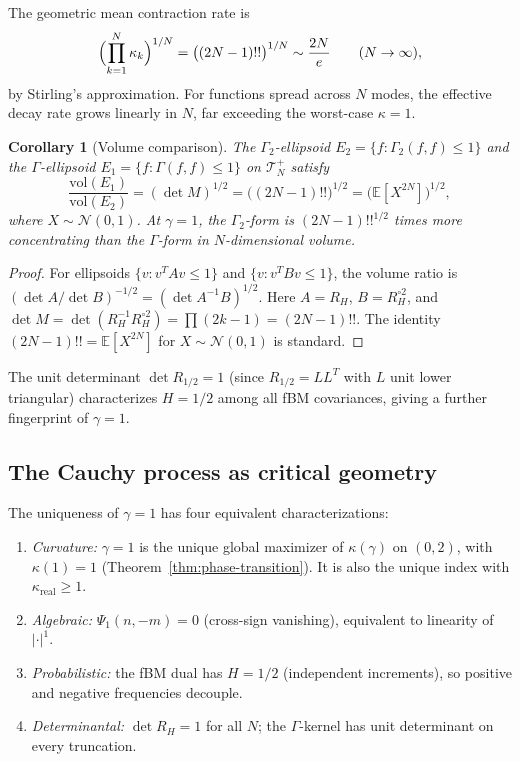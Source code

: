\documentclass[11pt,a4paper]{article}
\theoremstyle{plain}
\newtheorem{corollary}[theorem]{Corollary}
\theoremstyle{definition}
\theoremstyle{remark}
\newcommand{\E}{\mathbb{E}}
\begin{document}
The geometric mean contraction rate is
\[
  \Bigl(\prod_{k=1}^N \kappa_k\Bigr)^{1/N}
  = \bigl((2N-1)!!\bigr)^{1/N} \sim \frac{2N}{e}
  \qquad (N \to \infty),
\]
by Stirling's approximation.
For functions spread across $N$ modes, the effective decay rate
grows linearly in $N$, far exceeding the worst-case $\kappa = 1$.

\begin{corollary}[Volume comparison]\label{cor:volume}
The $\Gamma_2$-ellipsoid
$E_2 = \{f : \Gamma_2(f,f) \leq 1\}$ and the $\Gamma$-ellipsoid
$E_1 = \{f : \Gamma(f,f) \leq 1\}$ on $\mathcal{T}_N^+$ satisfy
\begin{equation}\label{eq:volume-ratio}
  \frac{\mathrm{vol}(E_1)}{\mathrm{vol}(E_2)}
  = (\det M)^{1/2} = \bigl((2N-1)!!\bigr)^{1/2}
  = \bigl(\E[X^{2N}]\bigr)^{1/2},
\end{equation}
where $X \sim \mathcal{N}(0,1)$.
At $\gamma = 1$, the $\Gamma_2$-form is $(2N-1)!!^{1/2}$ times
more concentrating than the $\Gamma$-form in $N$-dimensional volume.
\end{corollary}

\begin{proof}
For ellipsoids $\{v : v^T A v \leq 1\}$ and $\{v : v^T B v \leq 1\}$,
the volume ratio is $(\det A / \det B)^{-1/2} = (\det A^{-1}B)^{1/2}$.
Here $A = R_H$, $B = R_H^{\circ 2}$, and $\det M = \det(R_H^{-1}R_H^{\circ 2})
= \prod(2k-1) = (2N-1)!!$.
The identity $(2N-1)!! = \E[X^{2N}]$ for $X \sim \mathcal{N}(0,1)$
is standard.
\end{proof}

The unit determinant $\det R_{1/2} = 1$ (since $R_{1/2} = LL^T$
with $L$ unit lower triangular) characterizes $H = 1/2$ among
all fBM covariances, giving a further fingerprint of $\gamma = 1$.


\subsection{The Cauchy process as critical geometry}

The uniqueness of $\gamma = 1$ has four equivalent characterizations:
\begin{enumerate}[label=(\alph*)]
\item \emph{Curvature:} $\gamma = 1$ is the unique global maximizer of
  $\kappa(\gamma)$ on $(0,2)$, with $\kappa(1) = 1$
  (Theorem~\ref{thm:phase-transition}).
  It is also the unique index with
  $\kappa_{\mathrm{real}} \geq 1$.
\item \emph{Algebraic:} $\Psi_1(n,-m) = 0$ (cross-sign vanishing),
  equivalent to linearity of $|\cdot|^1$.
\item \emph{Probabilistic:} the fBM dual has $H = 1/2$ (independent
  increments), so positive and negative frequencies decouple.
\item \emph{Determinantal:} $\det R_H = 1$ for all $N$; the
  $\Gamma$-kernel has unit determinant on every truncation.
\end{enumerate}
\end{document}
